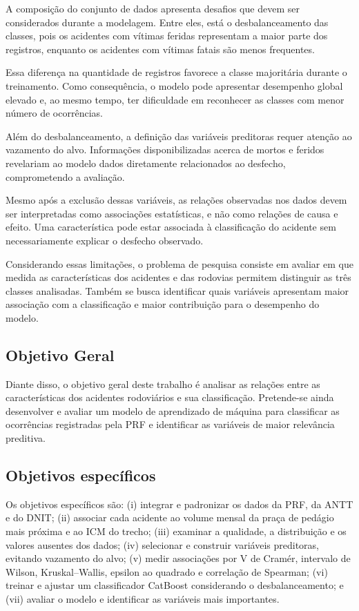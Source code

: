 \documentclass[12pt]{article}
\begin{document}
A composição do conjunto de dados apresenta desafios que devem ser considerados durante a modelagem. Entre eles, está o desbalanceamento das classes, pois os acidentes com vítimas feridas representam a maior parte dos registros, enquanto os acidentes com vítimas fatais são menos frequentes.

Essa diferença na quantidade de registros favorece a classe majoritária durante o treinamento. Como consequência, o modelo pode apresentar desempenho global elevado e, ao mesmo tempo, ter dificuldade em reconhecer as classes com menor número de ocorrências.

Além do desbalanceamento, a definição das variáveis preditoras requer atenção ao vazamento do alvo. Informações disponibilizadas acerca de mortos e feridos revelariam ao modelo dados diretamente relacionados ao desfecho, comprometendo a avaliação.

Mesmo após a exclusão dessas variáveis, as relações observadas nos dados devem ser interpretadas como associações estatísticas, e não como relações de causa e efeito. Uma característica pode estar associada à classificação do acidente sem necessariamente explicar o desfecho observado.

Considerando essas limitações, o problema de pesquisa consiste em avaliar em que medida as características dos acidentes e das rodovias permitem distinguir as três classes analisadas. Também se busca identificar quais variáveis apresentam maior associação com a classificação e maior contribuição para o desempenho do modelo.

\subsection{Objetivo Geral}

Diante disso, o objetivo geral deste trabalho é analisar as relações entre as características dos acidentes rodoviários e sua classificação. Pretende-se ainda desenvolver e avaliar um modelo de aprendizado de máquina para classificar as ocorrências registradas pela PRF e identificar as variáveis de maior relevância preditiva.

\subsection{Objetivos específicos}

Os objetivos específicos são: (i) integrar e padronizar os dados da PRF, da ANTT e do DNIT; (ii) associar cada acidente ao volume mensal da praça de pedágio mais próxima e ao ICM do trecho; (iii) examinar a qualidade, a distribuição e os valores ausentes dos dados; (iv) selecionar e construir variáveis preditoras, evitando vazamento do alvo; (v) medir associações por V de Cramér, intervalo de Wilson, Kruskal--Wallis, epsilon ao quadrado e correlação de Spearman; (vi) treinar e ajustar um classificador CatBoost considerando o desbalanceamento; e (vii) avaliar o modelo e identificar as variáveis mais importantes.
\end{document}
